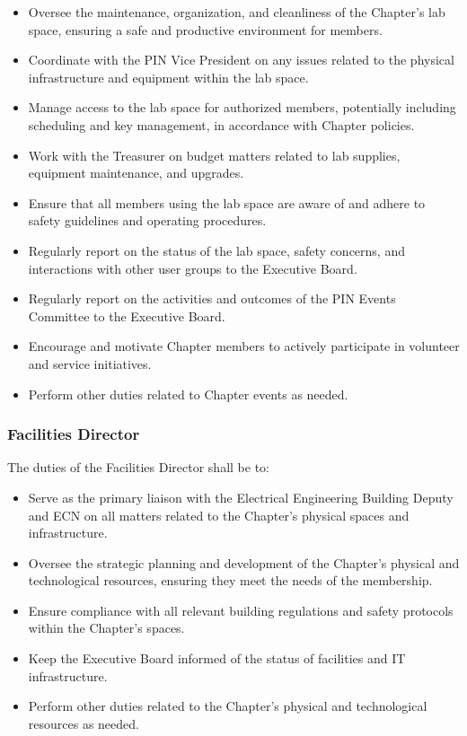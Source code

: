 \documentclass[10pt, oneside]{article}
\begin{document}
\begin{itemize}
    \item Oversee the maintenance, organization, and cleanliness of the Chapter's lab space, ensuring a safe and productive environment for members.
    \item Coordinate with the PIN Vice President on any issues related to the physical infrastructure and equipment within the lab space.
    \item Manage access to the lab space for authorized members, potentially including scheduling and key management, in accordance with Chapter policies.
    \item Work with the Treasurer on budget matters related to lab supplies, equipment maintenance, and upgrades.
    \item Ensure that all members using the lab space are aware of and adhere to safety guidelines and operating procedures.
    \item Regularly report on the status of the lab space, safety concerns, and interactions with other user groups to the Executive Board.
    \item Regularly report on the activities and outcomes of the PIN Events Committee to the Executive Board.
    \item Encourage and motivate Chapter members to actively participate in volunteer and service initiatives.
    \item Perform other duties related to Chapter events as needed.
\end{itemize}
\subsubsection{Facilities Director}
The duties of the Facilities Director shall be to:
\begin{itemize}
    \item Serve as the primary liaison with the Electrical Engineering Building Deputy and ECN on all matters related to the Chapter's physical spaces and infrastructure.
    \item Oversee the strategic planning and development of the Chapter's physical and technological resources, ensuring they meet the needs of the membership.
    \item Ensure compliance with all relevant building regulations and safety protocols within the Chapter's spaces.
    \item Keep the Executive Board informed of the status of facilities and IT infrastructure.
    \item Perform other duties related to the Chapter's physical and technological resources as needed.
\end{itemize}
\end{document}
